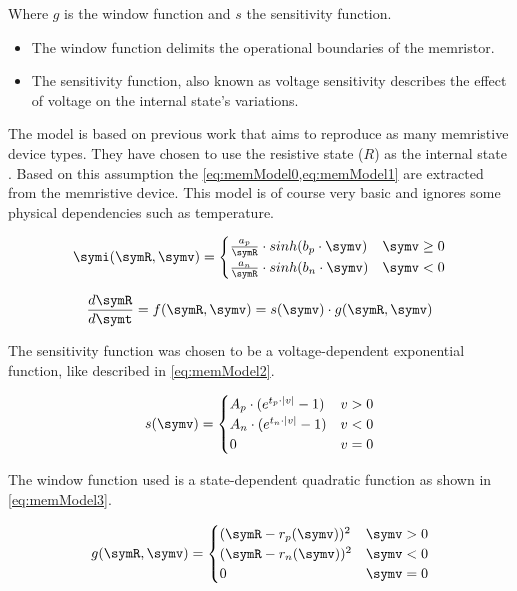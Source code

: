 Where $g$ is the window function and $s$ the sensitivity function.

\begin{itemize}
  \item The window function delimits the operational boundaries of the memristor.
  \item The sensitivity function, also known as voltage sensitivity describes the effect of voltage on the internal state's variations.
\end{itemize}

The model is based on previous work \cite{memCadenceModel} that aims to reproduce as many memristive device types. They have chosen to use the resistive state ($R$) as the internal state \cite{memModelOrigin}. Based on this assumption the \cref{eq:memModel0,eq:memModel1} are extracted from the memristive device. This model is of course very basic and ignores some physical dependencies such as temperature.

\begin{equation}\label{eq:memModel0}
  \symi(\symR,\symv)=
  \begin{cases}
    \frac{a_p}{\symR}\cdot sinh(b_p\cdot \symv) & \symv\ge 0\\
    \frac{a_n}{\symR}\cdot sinh(b_n\cdot \symv) & \symv<0\\
  \end{cases}
\end{equation}

\begin{equation}\label{eq:memModel1}
  \frac{d\symR}{d\symt}=f(\symR,\symv)=s(\symv)\cdot g(\symR,\symv)
\end{equation}

The sensitivity function was chosen to be a voltage-dependent exponential function, like described in \cref{eq:memModel2}.

\begin{equation}\label{eq:memModel2}
  s(\symv)=
  \begin{cases}
    A_p\cdot (e^{t_p\cdot |v|}-1)& v>0\\
    A_n\cdot (e^{t_n\cdot |v|}-1)& v<0\\
    0 &  v=0\\
  \end{cases}
\end{equation}

The window function used is a state-dependent quadratic function as shown in \cref{eq:memModel3}.

\begin{equation}\label{eq:memModel3}
  g(\symR,\symv)=
  \begin{cases}
    (\symR-r_p(\symv))^2& \symv>0\\
    (\symR-r_n(\symv))^2& \symv<0\\
    0 &  \symv=0\\
  \end{cases}
\end{equation}

